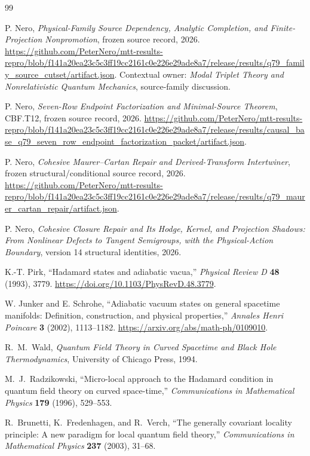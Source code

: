 \documentclass[11pt]{article}
\theoremstyle{definition}
\theoremstyle{remark}
\begin{document}
\begin{thebibliography}{99}

P. Nero, \emph{Physical-Family Source Dependency, Analytic Completion, and
Finite-Projection Nonpromotion}, frozen source record, 2026.
\url{https://github.com/PeterNero/mtt-results-repro/blob/f141a20ea23c5c3ff19cc2161c0e226e29ade8a7/release/results/q79_family_source_cutset/artifact.json}.
Contextual owner: \emph{Modal Triplet Theory and Nonrelativistic Quantum
Mechanics}, source-family discussion.

P. Nero, \emph{Seven-Row Endpoint Factorization and Minimal-Source Theorem},
CBF.T12, frozen source record, 2026.
\url{https://github.com/PeterNero/mtt-results-repro/blob/f141a20ea23c5c3ff19cc2161c0e226e29ade8a7/release/results/causal_base_q79_seven_row_endpoint_factorization_packet/artifact.json}.

P. Nero, \emph{Cohesive Maurer--Cartan Repair and Derived-Transform
Intertwiner}, frozen structural/conditional source record, 2026.
\url{https://github.com/PeterNero/mtt-results-repro/blob/f141a20ea23c5c3ff19cc2161c0e226e29ade8a7/release/results/q79_maurer_cartan_repair/artifact.json}.

P. Nero, \emph{Cohesive Closure Repair and Its Hodge, Kernel, and Projection
Shadows: From Nonlinear Defects to Tangent Semigroups, with the Physical-Action
Boundary}, version 14 structural identities, 2026.

K.-T. Pirk, ``Hadamard states and adiabatic vacua,''
\emph{Physical Review D} \textbf{48} (1993), 3779.
\url{https://doi.org/10.1103/PhysRevD.48.3779}.

W. Junker and E. Schrohe, ``Adiabatic vacuum states on general spacetime
manifolds: Definition, construction, and physical properties,''
\emph{Annales Henri Poincare} \textbf{3} (2002), 1113--1182.
\url{https://arxiv.org/abs/math-ph/0109010}.

R.~M.~Wald,
\emph{Quantum Field Theory in Curved Spacetime and Black Hole
Thermodynamics},
University of Chicago Press, 1994.

M.~J.~Radzikowski,
``Micro-local approach to the Hadamard condition in quantum field theory on
curved space-time,''
\emph{Communications in Mathematical Physics} \textbf{179} (1996),
529--553.

R.~Brunetti, K.~Fredenhagen, and R.~Verch,
``The generally covariant locality principle: A new paradigm for local
quantum field theory,''
\emph{Communications in Mathematical Physics} \textbf{237} (2003), 31--68.


\end{thebibliography}
\end{document}
